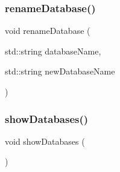 \mbox{\label{database_8cpp_a0659d93a42f84756e52155eb333c4fec}} 
\subsubsection{rename\+Database()}
{\footnotesize\ttfamily void rename\+Database (\begin{DoxyParamCaption}\item[{std\+::string}]{database\+Name,  }\item[{std\+::string}]{new\+Database\+Name }\end{DoxyParamCaption})}

\mbox{\label{database_8cpp_a812cc82c697df37c6a8a482f85972b4b}} 
\subsubsection{show\+Databases()}
{\footnotesize\ttfamily void show\+Databases (\begin{DoxyParamCaption}{ }\end{DoxyParamCaption})}

